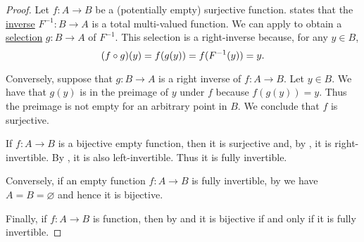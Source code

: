 \begin{proof}
   Let \( f: A \to B \) be a (potentially empty) surjective function.  states that the \hyperref[def:multi_valued_function/inverse]{inverse} \( F^{-1}: B \to A \) is a total multi-valued function. We can apply  to obtain a \hyperref[def:function/selection]{selection} \( g: B \to A \) of \( F^{-1} \). This selection is a right-inverse because, for any \( y \in B \),
  \begin{equation*}
    (f \mathbin \circ g)(y)
    =
    f(g(y))
    =
    f(F^{-1}(y))
    =
    y.
  \end{equation*}

  Conversely, suppose that \( g: B \to A \) is a right inverse of \( f: A \to B \). Let \( y \in B \). We have that \( g(y) \) is in the preimage of \( y \) under \( f \) because \( f(g(y)) = y \). Thus the preimage is not empty for an arbitrary point in \( B \). We conclude that \( f \) is surjective.

   If \( f: A \to B \) is a bijective empty function, then it is surjective and, by , it is right-invertible. By , it is also left-invertible. Thus it is fully invertible.

  Conversely, if an empty function \( f: A \to B \) is fully invertible, by  we have \( A = B = \varnothing \) and hence it is bijective.

  Finally, if \( f: A \to B \) is  function, then by  and  it is bijective if and only if it is fully invertible.
\end{proof}

